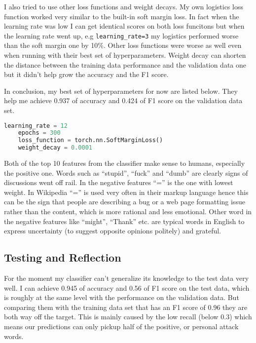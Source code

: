 \documentclass[11pt]{article} %
\begin{document}
I also tried to use other loss functions and weight decays. My own logistics loss function worked very similar to the built-in soft margin loss. In fact when the learning rate was low I can get identical scores on both loss funcitons but when the learning rate went up, e.g \verb|learning_rate=3| my logistics performed worse than the soft margin one by 10\%. Other loss functions were worse as well even when running with their best set of hyperparameters. Weight decay can shorten the distance between the training data performance and the validation data one but it didn't help grow the accuracy and the F1 score.

In conclusion, my best set of hyperparameters for now are listed below. They help me achieve 0.937 of accuracy and 0.424 of F1 score on the validation data set.

\begin{lstlisting}[language=Python]
    learning_rate = 12
    epochs = 300
    loss_function = torch.nn.SoftMarginLoss()
    weight_decay = 0.0001
\end{lstlisting}

Both of the top 10 features from the classifier make sense to humans, especially the positive one. Words such as ``stupid'', ``fuck'' and ``dumb'' are clearly signs of discussions went off rail. In the negative features ``='' is the one with lowest weight. In Wikipedia ``='' is used very often in their markup language hence this can be the sign that people are describing a bug or a web page formatting issue rather than the content, which is more rational and less emotional. Other word in the negative features like ``might'', ``Thank'' etc. are typical words in English to express uncertainty (to suggest opposite opinions politely) and grateful.

\subsection{Testing and Reflection}

For the moment my classifier can't generalize its knowledge to the test data very well. I can achieve 0.945 of accuracy and 0.56 of F1 score on the test data, which is roughly at the same level with the performance on the validation data. But comparing them with the training data set that has an F1 score of 0.96 they are both way off the target. This is mainly caused by the low recall (below 0.3) which means our predictions can only pickup half of the positive, or personal attack words.
\end{document}
